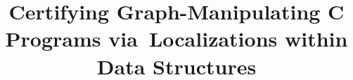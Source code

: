 \documentclass[acmsmall,screen]{acmart}  %
\newcommand\hide[1]{}
\providecommand{\DIFadd}[1]{{\protect\color{blue}\uwave{#1}}} %
\providecommand{\DIFdel}[1]{{\protect\color{red}\sout{#1}}}                      %
\providecommand{\DIFaddbegin}{} %
\providecommand{\DIFaddend}{} %
\providecommand{\DIFdelbegin}{} %
\providecommand{\DIFdelend}{} %
\newcommand{\DIFscaledelfig}{0.5}
\newlength{\DIFdelgraphicswidth} %
\newlength{\DIFdelgraphicsheight} %
\newcommand{\DIFaddincludegraphics}[2][]{{\color{blue}\fbox{\DIFOincludegraphics[#1]{#2}}}} %
\newcommand{\DIFdelincludegraphics}[2][]{%
\sbox{\DIFdelgraphicsbox}{\DIFOincludegraphics[#1]{#2}}%
\settoboxwidth{\DIFdelgraphicswidth}{\DIFdelgraphicsbox} %
\settoboxtotalheight{\DIFdelgraphicsheight}{\DIFdelgraphicsbox} %
\scalebox{\DIFscaledelfig}{%
\parbox[b]{\DIFdelgraphicswidth}{\usebox{\DIFdelgraphicsbox}\\[-\baselineskip] \rule{\DIFdelgraphicswidth}{0em}}\llap{\resizebox{\DIFdelgraphicswidth}{\DIFdelgraphicsheight}{%
\setlength{\unitlength}{\DIFdelgraphicswidth}%
\begin{picture}(1,1)%
\thicklines\linethickness{2pt} %
{\color[rgb]{1,0,0}\put(0,0){\framebox(1,1){}}}%
{\color[rgb]{1,0,0}\put(0,0){\line( 1,1){1}}}%
{\color[rgb]{1,0,0}\put(0,1){\line(1,-1){1}}}%
\end{picture}%
}\hspace*{3pt}}} %
} %
\DeclareRobustCommand{\DIFaddbegin}{\DIFOaddbegin \let\includegraphics\DIFaddincludegraphics} %
\DeclareRobustCommand{\DIFaddend}{\DIFOaddend \let\includegraphics\DIFOincludegraphics} %
\DeclareRobustCommand{\DIFdelbegin}{\DIFOdelbegin \let\includegraphics\DIFdelincludegraphics} %
\DeclareRobustCommand{\DIFdelend}{\DIFOaddend \let\includegraphics\DIFOincludegraphics} %
\begin{document}
\title[Certifying Graph-Manipulating Programs]
{Certifying Graph-Manipulating C Programs via~Localizations within Data Structures}



\hide{

\DIFdelbegin %
\DIFdel{First1 Last1}\DIFdelend \DIFaddbegin \author[S. Wang]{\DIFadd{Shengyi Wang}\DIFaddend }
\DIFdelbegin %
\DIFdelend \DIFaddbegin \affiliation{
\institution{National University of Singapore} }
\DIFaddend 


\DIFdelbegin %
\DIFdel{First2 Last2}\DIFdelend \DIFaddbegin \author[Q. Cao]{\DIFadd{Qinxiang Cao}\DIFaddend }
\DIFdelbegin %
\DIFdelend \DIFaddbegin \affiliation{\institution{Shanghai Jiao Tong University}}
\DIFaddend 


\DIFaddbegin \author[A. Mohan]{\DIFadd{Anshuman Mohan}}
\affiliation{\institution{National University of Singapore}}


\author[A. Hobor]{\DIFadd{Aquinas Hobor}}
\affiliation{\department{blah}\department{bloop}\institution{National University of Singapore}}
}


\hide{
\author{First2 Last2}
\authornote{with author2 note}          \orcid{nnnn-nnnn-nnnn-nnnn}             \affiliation{
  \position{Position2a}
  \department{Department2a}             \institution{Institution2a}           \streetaddress{Street2a Address2a}
  \city{City2a}
  \state{State2a}
  \postcode{Post-Code2a}
  \country{Country2a}                   }
\email{first2.last2@inst2a.com}         \affiliation{
  \position{Position2b}
  \department{Department2b}             \institution{Institution2b}           \streetaddress{Street3b Address2b}
  \city{City2b}
  \state{State2b}
  \postcode{Post-Code2b}
  \country{Country2b}                   }
\email{first2.last2@inst2b.org}         } 
\end{document}
